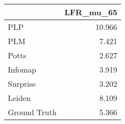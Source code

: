 \begin{tabular}{lr}
\toprule
{} & LFR_mu_65 \\
\midrule
PLP          &    10.966 \\
PLM          &     7.421 \\
Potts        &     2.627 \\
Infomap      &     3.919 \\
Surprise     &     3.202 \\
Leiden       &     8.109 \\
Ground Truth &     5.366 \\
\bottomrule
\end{tabular}
